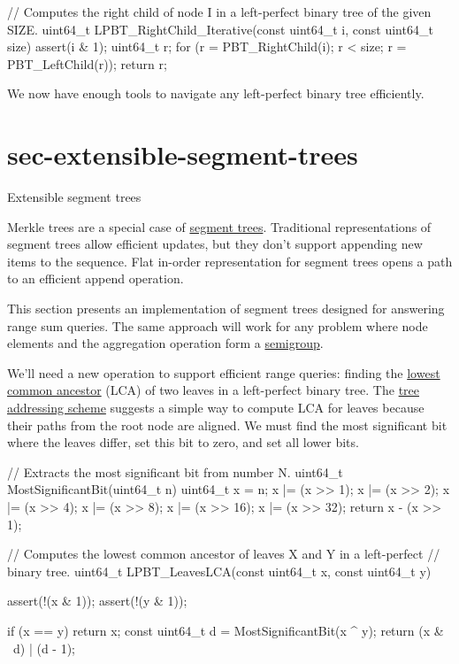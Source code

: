 \documentclass{article}
\begin{document}
\begin{code}[c]
// Computes the right child of node I in a left-perfect binary tree of the given SIZE.
uint64_t LPBT_RightChild_Iterative(const uint64_t i, const uint64_t size) {
    assert(i & 1);
    uint64_t r;
    for (r = PBT_RightChild(i); r < size; r = PBT_LeftChild(r));
    return r;
}
\end{code}

We now have enough tools to navigate any left-perfect binary tree efficiently.

\section{sec-extensible-segment-trees}{Extensible segment trees}

Merkle trees are a special case of \href{https://cp-algorithms.com/data_structures/segment_tree.html}{segment trees}.
Traditional representations of segment trees allow efficient updates, but they don't support appending new items to the sequence.
Flat in-order representation for segment trees opens a path to an efficient append operation.

This section presents an implementation of segment trees designed for answering range sum queries.
The same approach will work for any problem where node elements and the aggregation operation form a \href{https://en.wikipedia.org/wiki/Semigroup}{semigroup}.

We'll need a new operation to support efficient range queries: finding the \href{https://en.wikipedia.org/wiki/Lowest_common_ancestor}{lowest common ancestor} (LCA) of two leaves in a left-perfect binary tree.
The \href{#sec-addressing}{tree addressing scheme} suggests a simple way to compute LCA for leaves because their paths from the root node are aligned.
We must find the most significant bit where the leaves differ, set this bit to zero, and set all lower bits.

\begin{code}[c]
// Extracts the most significant bit from number N.
uint64_t MostSignificantBit(uint64_t n) {
    uint64_t x = n;
    x |= (x >> 1);
    x |= (x >> 2);
    x |= (x >> 4);
    x |= (x >> 8);
    x |= (x >> 16);
    x |= (x >> 32);
    return x - (x >> 1);
}

// Computes the lowest common ancestor of leaves X and Y in a left-perfect
// binary tree.
uint64_t LPBT_LeavesLCA(const uint64_t x, const uint64_t y) {
    assert(!(x & 1));
    assert(!(y & 1));

    if (x == y) return x;
    const uint64_t d = MostSignificantBit(x ^ y);
    return (x & ~d) | (d - 1);
}
\end{code}
\end{document}
